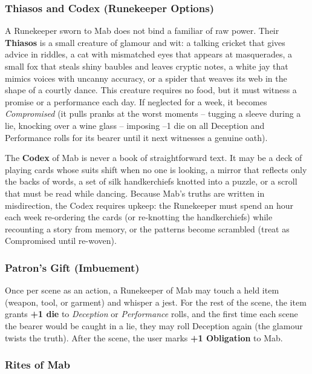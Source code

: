 \subsubsection*{Thiasos and Codex (Runekeeper Options)}

A Runekeeper sworn to Mab does not bind a familiar of raw power. Their \textbf{Thiasos} is a small creature of glamour and wit: a talking cricket that gives advice in riddles, a cat with mismatched eyes that appears at masquerades, a small fox that steals shiny baubles and leaves cryptic notes, a white jay that mimics voices with uncanny accuracy, or a spider that weaves its web in the shape of a courtly dance. This creature requires no food, but it must witness a promise or a performance each day. If neglected for a week, it becomes \textit{Compromised} (it pulls pranks at the worst moments -- tugging a sleeve during a lie, knocking over a wine glass -- imposing --1 die on all Deception and Performance rolls for its bearer until it next witnesses a genuine oath).

The \textbf{Codex} of Mab is never a book of straightforward text. It may be a deck of playing cards whose suits shift when no one is looking, a mirror that reflects only the backs of words, a set of silk handkerchiefs knotted into a puzzle, or a scroll that must be read while dancing. Because Mab's truths are written in misdirection, the Codex requires upkeep: the Runekeeper must spend an hour each week re-ordering the cards (or re-knotting the handkerchiefs) while recounting a story from memory, or the patterns become scrambled (treat as Compromised until re-woven).

\subsubsection*{Patron's Gift (Imbuement)}

Once per scene as an action, a Runekeeper of Mab may touch a held item (weapon, tool, or garment) and whisper a jest. For the rest of the scene, the item grants \textbf{+1 die} to \textit{Deception} or \textit{Performance} rolls, and the first time each scene the bearer would be caught in a lie, they may roll Deception again (the glamour twists the truth). After the scene, the user marks \textbf{+1 Obligation} to Mab.

\subsubsection*{Rites of Mab}

